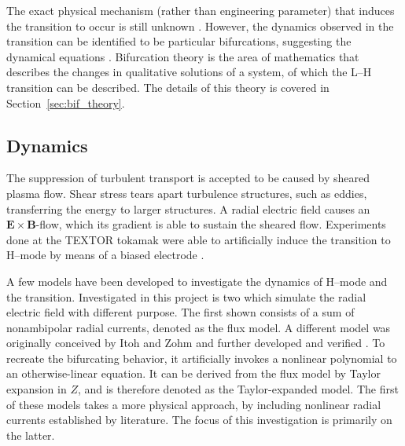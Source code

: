 The exact physical mechanism (rather than engineering parameter) that induces the transition to occur is still unknown \cite{itoh_structural_2016}.
However, the dynamics observed in the transition can be identified to be particular bifurcations, suggesting the dynamical equations \cite{weymiens_bifurcation_2012}.
Bifurcation theory is the area of mathematics that describes the changes in qualitative solutions of a system, of which the L--H transition can be described.
The details of this theory is covered in Section~\ref{sec:bif_theory}.

\subsection{Dynamics}\label{ssec:dynamics}
The suppression of turbulent transport is accepted to be caused by sheared plasma flow.
Shear stress tears apart turbulence structures, such as eddies, transferring the energy to larger structures.
A radial electric field causes an $\mathbf{E}\times\mathbf{B}$-flow, which its gradient is able to sustain the sheared flow.
Experiments done at the TEXTOR tokamak were able to artificially induce the transition to H--mode by means of a biased electrode \cite{weynants_confinement_1992}.

A few models have been developed to investigate the dynamics of H--mode and the transition.
Investigated in this project is two which simulate the radial electric field with different purpose.
The first shown consists of a sum of nonambipolar radial currents, denoted as the flux model.
A different model was originally conceived by Itoh \cite{itoh_edge_1991} and Zohm \cite{zohm_dynamic_1994} and further developed and verified \cite{paquay_studying_2012} \cite{weymiens_bifurcation_2014}.
To recreate the bifurcating behavior, it artificially invokes a nonlinear polynomial to an otherwise-linear equation.
It can be derived from the flux model by Taylor expansion in $Z$, and is therefore denoted as the Taylor-expanded model.
The first of these models takes a more physical approach, by including nonlinear radial currents established by literature.
The focus of this investigation is primarily on the latter.

